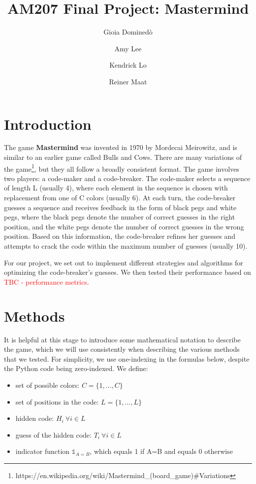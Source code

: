 \documentclass[11pt]{article}
\title{AM207 Final Project: Mastermind}
\author{Gioia Domined\`o \and Amy Lee \and Kendrick Lo \and Reiner Maat}
\begin{document}
\maketitle{}


\begin{abstract}
\end{abstract}

\section{Introduction}

The game \textbf{Mastermind} was invented in 1970 by Mordecai Meirowitz, and is similar to an earlier game called Bulls and Cows. There are many variations of the game\footnote{https://en.wikipedia.org/wiki/Mastermind\_(board\_game)\#Variations}, but they all follow a broadly consistent format. The game involves two players: a code-maker and a code-breaker. The code-maker selects a sequence of length L (usually 4), where each element in the sequence is chosen with replacement from one of C colors (usually 6). At each turn, the code-breaker guesses a sequence and receives feedback in the form of black pegs and white pegs, where the black pegs denote the number of correct guesses in the right position, and the white pegs denote the number of correct guesses in the wrong position. Based on this information, the code-breaker refines her guesses and attempts to crack the code within the maximum number of guesses (usually 10).

For our project, we set out to implement different strategies and algorithms for optimizing the code-breaker's guesses. We then tested their performance based on \textcolor{red}{TBC - performance metrics}.

\section{Methods}

It is helpful at this stage to introduce some mathematical notation to describe the game, which we will use consistently when describing the various methods that we tested. For simplicity, we use one-indexing in the formulas below, despite the Python code being zero-indexed.  We define:
\begin{itemize}
\item set of possible colors: $C = \{1, ..., C\}$
\item set of positions in the code: $L = \{1, ..., L\}$
\item hidden code: $H_i \ \forall i \in L$
\item guess of the hidden code: $T_i \ \forall i \in L$
\item indicator function $\mathbb{1}_{A=B}$, which equals 1 if A=B and equals 0 otherwise
\end{itemize}
\end{document}
